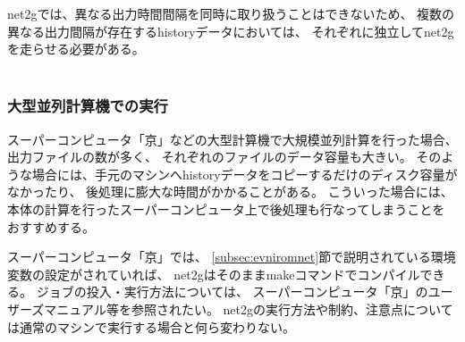 net2gでは、異なる出力時間間隔を同時に取り扱うことはできないため、
複数の異なる出力間隔が存在するhistoryデータにおいては、
それぞれに独立してnet2gを走らせる必要がある。\\

\\



\subsubsection{大型並列計算機での実行}
スーパーコンピュータ「京」などの大型計算機で大規模並列計算を行った場合、出力ファイルの数が多く、
それぞれのファイルのデータ容量も大きい。
そのような場合には、手元のマシンへhistoryデータをコピーするだけのディスク容量がなかったり、
後処理に膨大な時間がかかることがある。
こういった場合には、
\scalerm 本体の計算を行ったスーパーコンピュータ上で後処理も行なってしまうことを
おすすめする。

スーパーコンピュータ「京」では、
\ref{subsec:evniromnet}節で説明されている環境変数の設定がされていれば、
net2gはそのままmakeコマンドでコンパイルできる。
ジョブの投入・実行方法については、
スーパーコンピュータ「京」のユーザーズマニュアル等を参照されたい。
net2gの実行方法や制約、注意点については通常のマシンで実行する場合と何ら変わりない。




